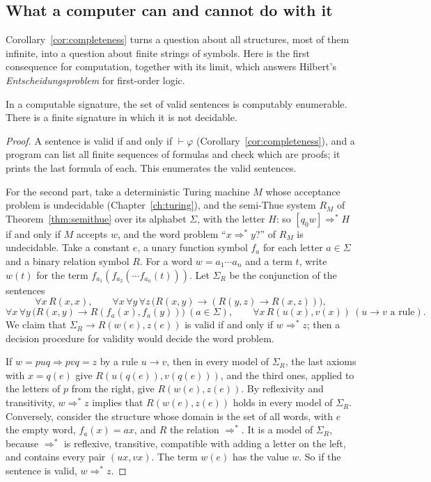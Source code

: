 \subsection*{What a computer can and cannot do with it}

Corollary~\ref{cor:completeness} turns a question about all structures, most of them infinite, into a question about finite strings of symbols. Here is the first consequence for computation, together with its limit, which answers Hilbert's \emph{Entscheidungsproblem} for first-order logic.

\begin{theorem}\label{thm:church}
In a computable signature, the set of valid sentences is computably enumerable. There is a finite signature in which it is not decidable.
\end{theorem}

\begin{proof}
A sentence is valid if and only if $\vdash\varphi$ (Corollary~\ref{cor:completeness}), and a program can list all finite sequences of formulas and check which are proofs; it prints the last formula of each. This enumerates the valid sentences.

For the second part, take a deterministic Turing machine $M$ whose acceptance problem is undecidable (Chapter~\ref{ch:turing}), and the semi-Thue system $R_M$ of Theorem~\ref{thm:semithue} over its alphabet $\Sigma$, with the letter $H$: so $[q_0w]\Rightarrow^*H$ if and only if $M$ accepts $w$, and the word problem ``$x\Rightarrow^*y$?'' of $R_M$ is undecidable. Take a constant $e$, a unary function symbol $f_a$ for each letter $a\in\Sigma$ and a binary relation symbol $R$. For a word $w=a_1\cdots a_n$ and a term $t$, write $w(t)$ for the term $f_{a_1}(f_{a_2}(\cdots f_{a_n}(t)))$. Let $\Sigma_R$ be the conjunction of the sentences
\[
\forall x\,R(x,x),\qquad\forall x\,\forall y\,\forall z\,\bigl(R(x,y)\to(R(y,z)\to R(x,z))\bigr),
\]
\[
\forall x\,\forall y\,\bigl(R(x,y)\to R(f_a(x),f_a(y))\bigr)\ (a\in\Sigma),\qquad\forall x\,R(u(x),v(x))\ (u\to v\text{ a rule}).
\]
We claim that $\Sigma_R\to R(w(e),z(e))$ is valid if and only if $w\Rightarrow^*z$; then a decision procedure for validity would decide the word problem.

If $w=pu q\Rightarrow pvq=z$ by a rule $u\to v$, then in every model of $\Sigma_R$, the last axioms with $x=q(e)$ give $R(u(q(e)),v(q(e)))$, and the third ones, applied to the letters of $p$ from the right, give $R(w(e),z(e))$. By reflexivity and transitivity, $w\Rightarrow^*z$ implies that $R(w(e),z(e))$ holds in every model of $\Sigma_R$. Conversely, consider the structure whose domain is the set of all words, with $e$ the empty word, $f_a(x)=ax$, and $R$ the relation $\Rightarrow^*$. It is a model of $\Sigma_R$, because $\Rightarrow^*$ is reflexive, transitive, compatible with adding a letter on the left, and contains every pair $(ux,vx)$. The term $w(e)$ has the value $w$. So if the sentence is valid, $w\Rightarrow^*z$.
\end{proof}

